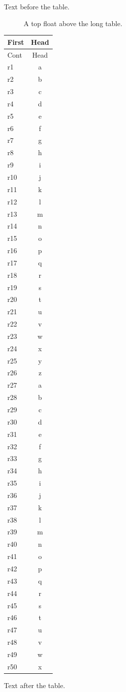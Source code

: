 \documentclass[12pt]{article}
\begin{document}
Text before the table.

\begin{figure}[t]
\caption{A top float above the long table.}
\end{figure}

\begin{longtable}{lc}
\hline First & Head\\\hline
\endfirsthead
\hline Cont & Head\\\hline
\endhead
\hline
\endfoot
\hline\hline
\endlastfoot
r1 & a\\
r2 & b\\
r3 & c\\
r4 & d\\
r5 & e\\
r6 & f\\
r7 & g\\
r8 & h\\
r9 & i\\
r10 & j\\
r11 & k\\
r12 & l\\
r13 & m\\
r14 & n\\
r15 & o\\
r16 & p\\
r17 & q\\
r18 & r\\
r19 & s\\
r20 & t\\
r21 & u\\
r22 & v\\
r23 & w\\
r24 & x\\
r25 & y\\
r26 & z\\
r27 & a\\
r28 & b\\
r29 & c\\
r30 & d\\
r31 & e\\
r32 & f\\
r33 & g\\
r34 & h\\
r35 & i\\
r36 & j\\
r37 & k\\
r38 & l\\
r39 & m\\
r40 & n\\
r41 & o\\
r42 & p\\
r43 & q\\
r44 & r\\
r45 & s\\
r46 & t\\
r47 & u\\
r48 & v\\
r49 & w\\
r50 & x\\
\end{longtable}

Text after the table.
\end{document}
